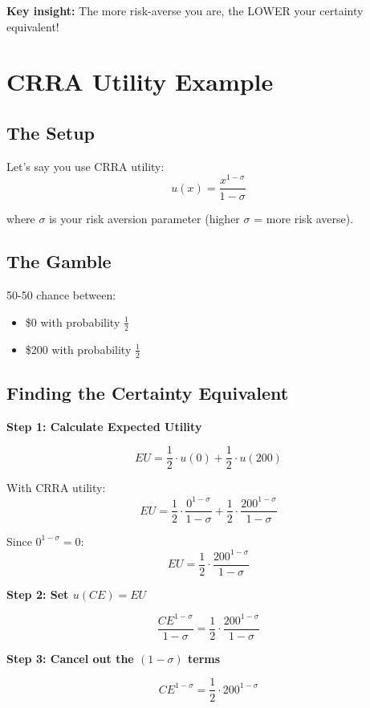 \documentclass[12pt]{article}
\begin{document}
\vspace{0.3cm}

\textbf{Key insight:} The more risk-averse you are, the LOWER your certainty equivalent!

\newpage

\section*{CRRA Utility Example}

\subsection*{The Setup}

Let's say you use CRRA utility:
\[
u(x) = \frac{x^{1-\sigma}}{1-\sigma}
\]

where $\sigma$ is your risk aversion parameter (higher $\sigma$ = more risk averse).

\subsection*{The Gamble}

50-50 chance between:
\begin{itemize}
\item \$0 with probability $\frac{1}{2}$
\item \$200 with probability $\frac{1}{2}$
\end{itemize}

\subsection*{Finding the Certainty Equivalent}

\textbf{Step 1: Calculate Expected Utility}

\[
EU = \frac{1}{2} \cdot u(0) + \frac{1}{2} \cdot u(200)
\]

With CRRA utility:
\[
EU = \frac{1}{2} \cdot \frac{0^{1-\sigma}}{1-\sigma} + \frac{1}{2} \cdot \frac{200^{1-\sigma}}{1-\sigma}
\]

Since $0^{1-\sigma} = 0$:
\[
EU = \frac{1}{2} \cdot \frac{200^{1-\sigma}}{1-\sigma}
\]

\textbf{Step 2: Set $u(CE) = EU$}

\[
\frac{CE^{1-\sigma}}{1-\sigma} = \frac{1}{2} \cdot \frac{200^{1-\sigma}}{1-\sigma}
\]

\textbf{Step 3: Cancel out the $(1-\sigma)$ terms}

\[
CE^{1-\sigma} = \frac{1}{2} \cdot 200^{1-\sigma}
\]
\end{document}
